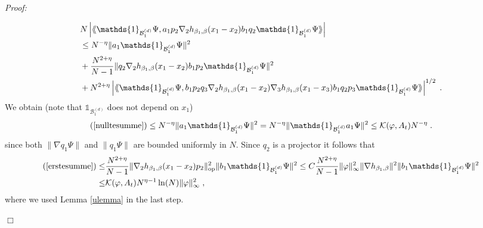 \documentclass[11pt, english, american]{article}
\newcommand{\laa}{\langle\hspace{-0.08cm}\langle}
\newcommand{\raa}{\rangle\hspace{-0.08cm}\rangle}
\newenvironment{proof}{\emph{Proof:}}{\begin{flushright} $ \Box $ \end{flushright}}
\renewcommand{\phi}{\varphi}
\begin{document}
\begin{proof}
\begin{enumerate}
\begin{align}\label{nulltesumme}
&N\left|\laa \mathds{1}_{{\mathcal{B}_1^{(d)}}} \Psi, a_1p_2\nabla_2 h_{\beta_1,\beta}(x_1-x_2)b_1q_2 \mathds{1}_{{\mathcal{B}_1^{(d)}}} \Psi\raa\right|
\nonumber
\\
&\leq N^{-\eta}\|a_1 \mathds{1}_{{\mathcal{B}_1^{(d)}}} \Psi\|^2
%
\\&+
\label{erstesumme}\frac{N^{2+\eta}}{N-1}\|q_2\nabla_2 h_{\beta_1,\beta}(x_1-x_2)b_1 p_2 \mathds{1}_{{\mathcal{B}_1^{(d)}}} \Psi\|^2
 \\\label{zweitesumme}&+N^{2+\eta}\left|\laa \mathds{1}_{{\mathcal{B}_1^{(d)}}} \Psi, b_1 p_2 q_3\nabla_2 h_{\beta_1,\beta}(x_1-x_2)\nabla_3 h_{\beta_1,\beta}
(x_1-x_3)b_1 q_2p_3\mathds{1}_{{\mathcal{B}_1^{(d)}}} \Psi\raa\right|^{1/2}
 \;.
 \end{align}
We obtain (note that $\mathds{1}_{{\mathcal{B}_1^{(d)}}} $ does not depend on $x_1$)
$$(\ref{nulltesumme})\leq N^{-\eta}\|a_1 \mathds{1}_{{\mathcal{B}_1^{(d)}}} \Psi\|^2
=
 N^{-\eta}\| \mathds{1}_{{\mathcal{B}_1^{(d)}}} a_1\Psi\|^2
\leq  
\mathcal{K}(\phi, A_t)
N^{-\eta}\;.$$
since both $ \| \nabla q_1 \Psi\|$ and $ \| q_1 \Psi\|$ are bounded uniformly in $N$.
Since $q_2$ is a projector it follows that
\begin{align*}
 (\ref{erstesumme})
 \leq&\frac{N^{2+\eta}}{N-1}\|\nabla_2 h_{\beta_1,\beta}(x_1-x_2)p_2\|_{\text{op}}^2
 \|b_1 \mathds{1}_{{\mathcal{B}_1^{(d)}}} \Psi\|^2
\leq 
C
\frac{N^{2+\eta}}{N-1}
\|\phi\|_\infty ^2
\|\nabla h_{\beta_1,\beta}\|^2
\|b_1 \mathds{1}_{{\mathcal{B}_1^{(d)}}} \Psi\|^2
\\
\leq&
\mathcal{K}(\phi, A_t)
N^{\eta-1}\ln(N)
\|\phi\|_\infty ^2
 \;,
 \end{align*}
where we used Lemma \ref{ulemma} in the last step.


\end{enumerate}
\end{proof}
\end{document}
